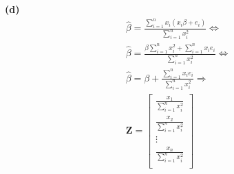 \documentclass[12pt]{article}
\newenvironment{problem}[2][Problem]{\begin{trivlist}
\item[\hskip \labelsep {\bfseries #1}\hskip \labelsep {\bfseries #2.}]}{\end{trivlist}}
\newenvironment{subproblem}[1]{\textbf{(#1)}}{}
\theoremstyle{definition}
\begin{document}
\begin{problem}{2}
\begin{subproblem}{d}
\begin{align*}
\hat{\beta} = \frac{\sum^n_{i=1} x_i (x_i\beta + e_i)}{\sum^n_{i=1} x_i^2} \Leftrightarrow \\
\hat{\beta} = \frac{\beta\sum^n_{i=1} x_i^2 + \sum^n_{i=1} x_ie_i}{\sum^n_{i=1} x_i^2} \Leftrightarrow \\
\hat{\beta} = \beta + \frac{\sum^n_{i=1} x_i e_i}{\sum^n_{i=1} x_i^2} \Rightarrow \\
\boldsymbol{Z} =
\begin{bmatrix}
    \frac{x_1}{\sum^n_{i=1} x_i^2} \\
    \frac{x_2}{\sum^n_{i=1} x_i^2} \\
    \vdots \\
    \frac{x_n}{\sum^n_{i=1} x_i^2} \\
\end{bmatrix}
\end{align*}
\end{subproblem}


\end{problem}
\end{document}
